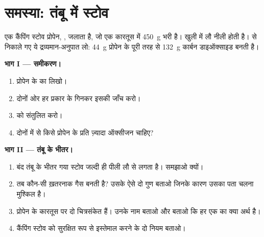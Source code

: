 \section{समस्या: तंबू में स्टोव}

\begin{problem}
\label{pb:g8:combustion-and-fuels:1}
एक कैंपिंग स्टोव प्रोपेन, , जलाता है, जो एक कारतूस में
\qty{450}{g} भरी है। खुली  में लौ नीली होती है।  से निकाले
गए ये द्रव्यमान-अनुपात लो: \qty{44}{g} प्रोपेन के पूरी तरह  से
\qty{132}{g} कार्बन डाइऑक्साइड बनती है।

\medskip
\noindent\textbf{भाग I --- समीकरण।}
\begin{enumerate}
  \item प्रोपेन के  का 
        लिखो।
  \item दोनों ओर हर प्रकार के  गिनकर इसकी जाँच करो।
  \item {}
         को संतुलित करो। %
  \item दोनों में से किसे प्रोपेन के प्रति  ज़्यादा ऑक्सीजन चाहिए?
\end{enumerate}

\medskip
\noindent\textbf{भाग II --- तंबू के भीतर।}
\begin{enumerate}[resume]
  \item बंद तंबू के भीतर  गया स्टोव जल्दी ही पीली लौ से  लगता है।
        समझाओ क्यों।
  \item तब कौन-सी ख़तरनाक गैस बनती है? उसके ऐसे दो गुण बताओ
        जिनके कारण उसका पता चलना मुश्किल है।
  \item प्रोपेन के कारतूस पर दो चित्रसंकेत हैं। उनके नाम बताओ और बताओ
        कि हर एक का क्या अर्थ है।
  \item कैंपिंग स्टोव को सुरक्षित रूप से इस्तेमाल करने के दो नियम बताओ।
\end{enumerate}


\end{problem}
